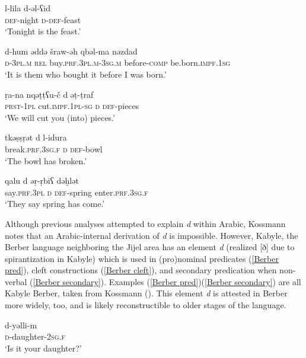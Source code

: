 \documentclass[output=paper]{langsci/langscibook}
\begin{document}
\ea\label{nonverbal}

\gll l-lila  d-ǝl-ʕid\\
     \textsc{def}-night  \textsc{d}-\textsc{def}-feast\\
\glt ‘Tonight is the feast.’
\z

\ea\label{clefts}

\gll d-hum  ǝddǝ  šraw-ǝh   qbǝl-ma  nǝzdad\\
     \textsc{d}-\textsc{3pl.m} \textsc{rel}  buy.\textsc{prf.3pl.m}-\textsc{3sg.m}  before-\textsc{comp} be.born.\textsc{impf.1sg}\\
\glt ‘It is them who bought it before I was born.’
\z

\ea\label{secondary pred}

\gll ṛa-na  nqǝṭṭʕu-č  d  ǝṭ-ṭraf\\
     \textsc{prst}-\textsc{1pl}  cut.\textsc{impf.1pl-sg}  \textsc{d}  \textsc{def}-pieces\\
\glt ‘We will cut you (into) pieces.’
\z

\ea\label{focus}

\gll tkǝṣṣṛǝt  d  l-idura\\
     break.\textsc{prf.3sg.f}  \textsc{d}  \textsc{def}-bowl\\
\glt ‘The bowl has broken.’
\z

\ea\label{left focalizations}

\gll qalu  d  ǝṛ-ṛbiʕ  dǝḫlǝt\\
     say.\textsc{prf.3pl}  \textsc{d}  \textsc{def}-spring  enter.\textsc{prf.3sg.f}\\
\glt ‘They say spring has come.’
\z

Although previous analyses attempted to explain \textit{d} within Arabic, Kossmann notes that an Arabic-internal derivation of \textit{d} is impossible. However, Kabyle, the Berber language neighboring the Jijel area has an element \textit{d} (realized [ð] due to spirantization in Kabyle) which is used in (pro)nominal predicates (\ref{Berber pred}), cleft constructions (\ref{Berber cleft}), and secondary predication when non-verbal (\ref{Berber secondary}). Examples (\ref{Berber pred})\textendash(\ref{Berber secondary}) are all Kabyle Berber, taken from Kossmann (\citeyear[135]{Kossmann2014}). This element \textit{d} is attested in Berber more widely, too, and is likely reconstructible to older stages of the language.

\ea\label{Berber pred}


\gll d-yǝlli-m\\
     \textsc{d}-daughter-\textsc{2sg.f}\\
\glt ‘Is it your daughter?’
\z
\end{document}
